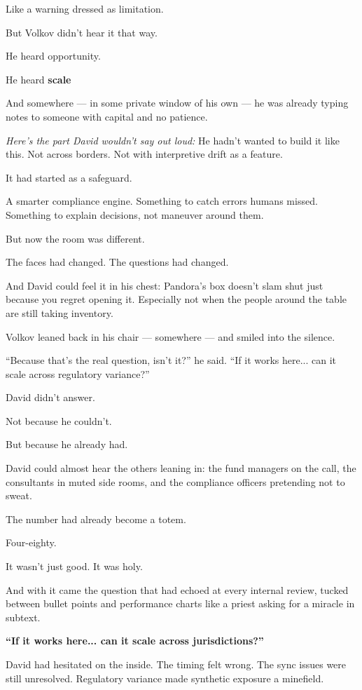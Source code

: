 Like a warning dressed as limitation.

But Volkov didn’t hear it that way.

He heard opportunity.

He heard \textbf{scale}

And somewhere --- in some private window of his own ---  
he was already typing notes to someone with capital and no patience.

\textit{Here’s the part David wouldn’t say out loud:}  
He hadn’t wanted to build it like this.  
Not across borders.  
Not with interpretive drift as a feature.

It had started as a safeguard.

A smarter compliance engine.  
Something to catch errors humans missed.  
Something to explain decisions, not maneuver around them.

But now the room was different.

The faces had changed.  
The questions had changed.

And David could feel it in his chest:
Pandora's box doesn’t slam shut just because you regret opening it.  
Especially not when the people around the table are still taking inventory.

Volkov leaned back in his chair — somewhere — and smiled into the silence.

  ``Because that’s the real question, isn’t it?'' he said.  
  ``If it works here...  
  can it scale across regulatory variance?''

David didn’t answer.

Not because he couldn’t.

But because he already had.


David could almost hear the others leaning in:
the fund managers on the call, 
the consultants in muted side rooms, 
and the compliance officers pretending not to sweat.

The number had already become a totem.

Four-eighty.

It wasn’t just good. It was holy.

And with it came the question that had echoed at every internal review, 
tucked between bullet points and 
performance charts like a priest asking for a miracle in subtext.

\textbf{“If it works here... can it scale across jurisdictions?”}

David had hesitated on the inside.
The timing felt wrong. 
The sync issues were still unresolved. 
Regulatory variance made synthetic exposure a minefield.

